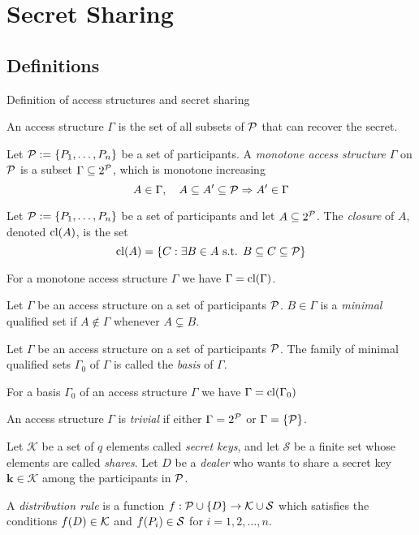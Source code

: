 \section{Secret Sharing}
\subsection{Definitions}
Definition of access structures and secret sharing

\cite{Phillips1992}
\cite{BlSt97}

An access structure $\Gamma$ is the set of all subsets of ${\mathcal P}$ that can recover the secret.

 Let ${\mathcal P} := \{ P_1, \dots, P_n \}$ be a set of participants. A \textit{monotone access structure} $\Gamma$ on ${\mathcal P}$ is a subset $\Gamma \subseteq 2^{{\mathcal P}}$, which is monotone increasing $$ A \in \Gamma, \quad A \subseteq A' \subseteq {\mathcal P} \Rightarrow A' \in \Gamma $$

 Let ${\mathcal P} := \{ P_1, \dots, P_n \}$ be a set of participants and let $A \subseteq 2^{{\mathcal P}}$. The \textit{closure} of $A$, denoted $\text{cl} (A)$, is the set $$ \text{cl} (A) = \{ C: \exists B \in A \text{ s.t. } B \subseteq C \subseteq {\mathcal P} \}$$

For a monotone access structure $\Gamma$ we have $\Gamma = \text{cl} (\Gamma)$.

 Let $\Gamma$ be an access structure on a set of participants ${\mathcal P}$. $B \in \Gamma$ is a \textit{minimal} qualified set if $A \notin \Gamma$ whenever $A \subsetneq B$.

 Let $\Gamma$ be an access structure on a set of participants ${\mathcal P}$. The family of minimal qualified sets $\Gamma_{0}$ of $\Gamma$ is called the \textit{basis} of $\Gamma$.

For a basis $\Gamma_0$ of an access structure $\Gamma$ we have $\Gamma = \text{cl} (\Gamma_{0})$

 An access structure $\Gamma$ is \textit{trivial} if either $\Gamma = 2^{{\mathcal P}}$ or $\Gamma = \{ {\mathcal P} \}$.

Let $\mathcal{K}$ be a set of $q$ elements called \textit{secret keys}, and let $\mathcal{S}$ be a finite set whose elements are called \textit{shares}. Let $D$ be a \textit{dealer} who wants to share a secret key $\mathbf{k} \in \mathcal{K}$ among the participants in ${\mathcal P}$. 

 A \textit{distribution rule} is a function $f : {\mathcal P} \cup \{ D \} \rightarrow \mathcal{K} \cup \mathcal{S}$ which satisfies the conditions $f(D) \in \mathcal{K}$ and $f(P_i) \in \mathcal{S}$ for $i = 1,2, \dots, n$.

